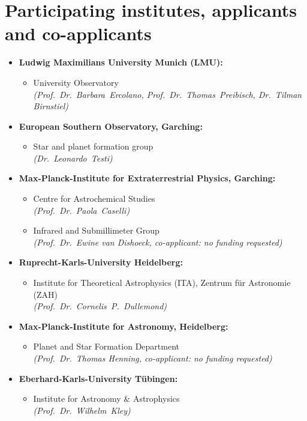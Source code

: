 \documentclass[10pt,fleqn,twoside,a4paper]{article}
\begin{document}
\section{Participating institutes,  applicants and co-applicants}
\label{app-institutes}
\begin{itemize}
\item {\bf Ludwig Maximilians University Munich (LMU):}
 \begin{itemize}
  \item University Observatory\\    
         {\em (Prof.~Dr.~Barbara~Ercolano, Prof.~Dr.~Thomas~Preibisch,
           Dr.~Tilman Birnstiel)}
  \end{itemize} 
\item {\bf European Southern Observatory, Garching:}
 \begin{itemize} 
\item Star and planet formation group \\
         {\em (Dr.~Leonardo~Testi)}
\end{itemize}
\item {\bf Max-Planck-Institute for Extraterrestrial Physics, Garching:}
 \begin{itemize} 
\item Centre for Astrochemical Studies \\
         {\em (Prof.~Dr.~Paola~Caselli)}
\item Infrared and Submillimeter Group\\
         {\em (Prof.~Dr.~Ewine van Dishoeck, co-applicant: no funding requested)}
\end{itemize}
\item {\bf Ruprecht-Karls-University Heidelberg:}
\begin{itemize}
 \item Institute for Theoretical Astrophysics (ITA), Zentrum f\"ur Astronomie (ZAH)\\
         {\em (Prof.~Dr.~Cornelis~P.~Dullemond)}
\end{itemize}
\item {\bf Max-Planck-Institute for Astronomy, Heidelberg:}
\begin{itemize}
 \item Planet and Star Formation Department\\
         {\em (Prof.~Dr.~Thomas Henning, co-applicant: no funding requested)}
\end{itemize}
\item {\bf Eberhard-Karls-University T\"ubingen:}
\begin{itemize}
  \item Institute for Astronomy \& Astrophysics\\
         {\em (Prof.~Dr.~Wilhelm~Kley)}
\end{itemize}
\end{itemize}
%
\vfill
\end{document}
